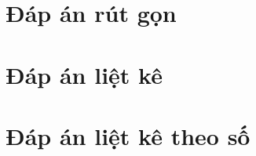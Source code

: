 \documentclass[12pt]{article}
\newenvironment{khung}{%
  \def\FrameCommand{\fcolorbox{black}{shadecolor}}%
  \MakeFramed {\advance\hsize-\width \FrameRestore}%
  }%
{\endMakeFramed}
\def\dkhung{
\begin{khung}
\noindent\theverbbox[t]
\end{khung}
}
\begin{document}
\newpage
\section{Đáp án rút gọn}
\begin{verbbox}
\thispagestyle{empty}
\indapanrutgon
\begin{multicols}{3}
\begin{enumerate}[\causo]
\foreachproblem[bttracnghiem]{\item\thisproblem}
\end{enumerate}
\end{multicols}
\end{verbbox}
\dkhung

\indapanrutgon
\thispagestyle{empty}
\begin{multicols}{3}
\begin{enumerate}[\causo]
\foreachproblem[bttracnghiem]{\item\thisproblem}
\end{enumerate}
\end{multicols}

\newpage
\section{Đáp án liệt kê}
\begin{verbbox}
\setcounter{page}{1}
\indapanlietke
\thispagestyle{empty}
\begin{center}
\begin{multicols}{5}
\begin{enumerate}[\causo]
\foreachproblem[bttracnghiem]{\item\thisproblem}
\end{enumerate}
\end{multicols}
\end{center}
\end{verbbox}
\dkhung

\setcounter{page}{1}
\indapanlietke
\thispagestyle{empty}
\begin{center}
\begin{multicols}{5}
\begin{enumerate}[\causo]
\foreachproblem[bttracnghiem]{\item\thisproblem}
\end{enumerate}
\end{multicols}
\end{center}


\newpage
\section{Đáp án liệt kê theo số}
\end{document}
